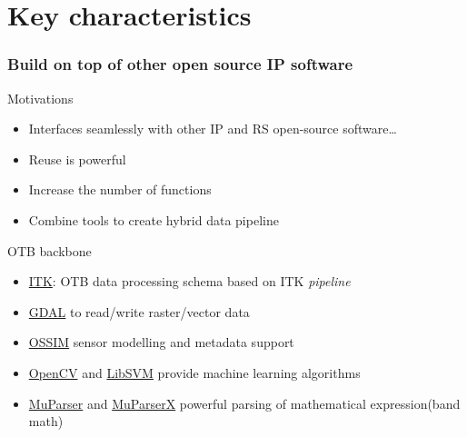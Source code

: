 \documentclass[8pt]{beamer}
\begin{document}
\section{Key characteristics}

\begin{frame}
\frametitle{Build on top of other open source IP software}
\begin{block}{Motivations}
\begin{itemize}
\item Interfaces seamlessly with other IP and RS open-source software\ldots
\item Reuse is powerful
\item Increase the number of functions
\item Combine tools to create hybrid data pipeline
\end{itemize} 
\end{block}

\begin{block}{OTB backbone}
\begin{itemize}
\item \href{www.itk.org}{ITK}: OTB data processing schema based on ITK \emph{pipeline}
\item \href{www.gdal.org}{GDAL} to read/write raster/vector data
\item \href{www.ossim.org}{OSSIM} sensor modelling and metadata support 
\item \href{www.opencv.org}{OpenCV} and \href{www.libsvm.org}{LibSVM} provide
  machine learning algorithms
\item \href{www.muparser.org}{MuParser} and \href{www.muparserx.org}{MuParserX}
  powerful parsing of mathematical expression(band math)
\end{itemize}
\end{block}


\end{frame}
\end{document}
